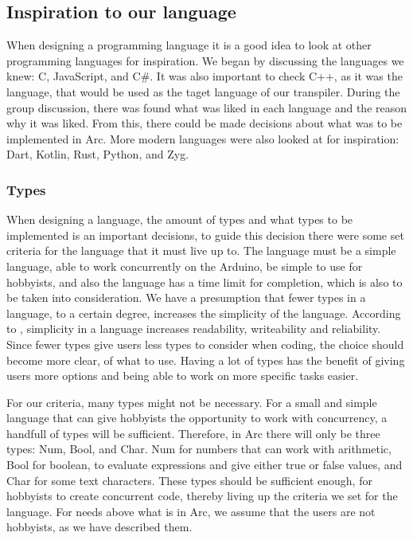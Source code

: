 \subsection{Inspiration to our language}\label{sec:inspiration}
When designing a programming language it is a good idea to look at other programming languages for inspiration. We began by discussing the languages we knew: C, JavaScript, and C\#. It was also important to check C++, as it was the language, that would be used as the taget language of our transpiler. During the group discussion, there was found what was liked in each language and the reason why it was liked. From this, there could be made decisions about what was to be implemented in Arc. More modern languages were also looked at for inspiration: Dart, Kotlin, Rust, Python, and Zyg. 




\subsubsection{Types}\label{sec:types}
When designing a language, the amount of types and what types to be implemented is an important decisions, to guide this decision there were some set criteria for the language that it must live up to. The language must be a simple language, able to work concurrently on the Arduino, be simple to use for hobbyists, and also the language has a time limit for completion, which is also to be taken into consideration. We have a presumption that fewer types in a language, to a certain degree, increases the simplicity of the language. According to , simplicity in a language increases readability, writeability and reliability. Since fewer types give users less types to consider when coding, the choice should become more clear, of what to use. Having a lot of types has the benefit of giving users more options and being able to work on more specific tasks easier.

For our criteria, many types might not be necessary. For a small and simple language that can give hobbyists the opportunity to work with concurrency, a handfull of types will be sufficient. Therefore, in Arc there will only be three types: Num, Bool, and Char. Num for numbers that can work with arithmetic, Bool for boolean, to evaluate expressions and give either true or false values, and Char for some text characters. These types should be sufficient enough, for hobbyists to create concurrent code, thereby living up the criteria we set for the language. For needs above what is in Arc, we assume that the users are not hobbyists, as we have described them. 


